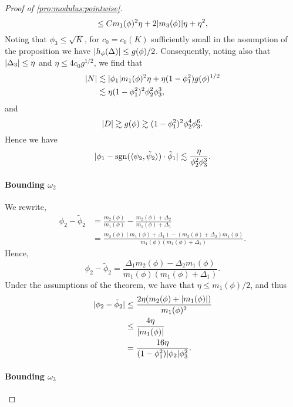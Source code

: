 \documentclass[journal]{IEEEtran}
\newcommand{\sgn}{\mathrm{sgn}}
\newcommand{\1}{\boldsymbol{1}}
\DeclarePairedDelimiter{\Inner}{\langle}{\rangle}
\DeclarePairedDelimiter{\abs}{\lvert}{\rvert}
\begin{document}
\begin{proof}[Proof of \cref{pro:modulus:pointwise}]
\begin{equation*}
		\leq Cm_1(\phi)^2 \eta + 2\abs{m_3(\phi)}\eta + \eta^2,
	\end{equation*}
	Noting that $\phi_3\leq \sqrt{K}$, for $c_0=c_0(K)$ sufficiently small in the assumption of the proposition we have $\abs{h_{\phi}(\Delta)} \leq g(\phi)/2$. Consequently, noting also that $\abs{\Delta_3}\leq \eta$ and $\eta \leq 4c_0 g^{1/2}$, we find that
	\begin{align*}
		\abs{N}%
		&\lesssim \abs{\phi_1}m_1(\phi)^2\eta%
		+ \eta(1-\phi_1^2) g(\phi)^{1/2}\\
		&\lesssim \eta (1 - \phi_1^2)^2 \phi_2^2\phi_3^3,
	\end{align*}
	and
	\begin{equation*}
		\abs{D}%
		\gtrsim g(\phi)%
		\gtrsim (1-\phi_1^2)^2\phi_2^4\phi_3^6.
	\end{equation*}
	Hence we have
	\begin{equation*}
		\abs{\phi_1 - \sgn(\Inner{\psi_2,\tilde{\psi}_2})\cdot \tilde{\phi}_1}%
		\lesssim \frac{\eta}{\phi_2^2\phi_3^3}.
	\end{equation*}
	\paragraph{Bounding $\omega_2$}

	We rewrite,
	\begin{align*}
		\phi_2 - \tilde{\phi}_2 %
		&= \frac{m_2(\phi)}{m_1(\phi)} - \frac{m_2(\phi) + \Delta_2}{m_1(\phi) + \Delta_1}\\
		&= \frac{m_2(\phi)(m_1(\phi) + \Delta_1) - (m_2(\phi) + \Delta_2)m_1(\phi)}{m_1(\phi)(m_1(\phi) + \Delta_1)}.
	\end{align*}
	Hence,
	\begin{equation*}
		\phi_2 - \tilde{\phi}_2%
		= \frac{\Delta_1 m_2(\phi) - \Delta_2 m_1(\phi)}{m_1(\phi)(m_1(\phi)+\Delta_1)}.
	\end{equation*}
	Under the assumptions of the theorem, we have that $\eta \leq m_1(\phi)/2$, and thus
	\begin{align*}
		\abs{\phi_2 - \tilde{\phi}_2}%
		&\leq \frac{2\eta(m_2(\phi) + |m_1(\phi)|)}{m_1(\phi)^2}\\
		&\leq \frac{4\eta}{|m_1(\phi)|}\\%
		&= \frac{16 \eta}{(1-\phi_1^2)|\phi_2|\phi_3^2}.
	\end{align*}

	\paragraph{Bounding $\omega_3$}


\end{proof}
\end{document}
